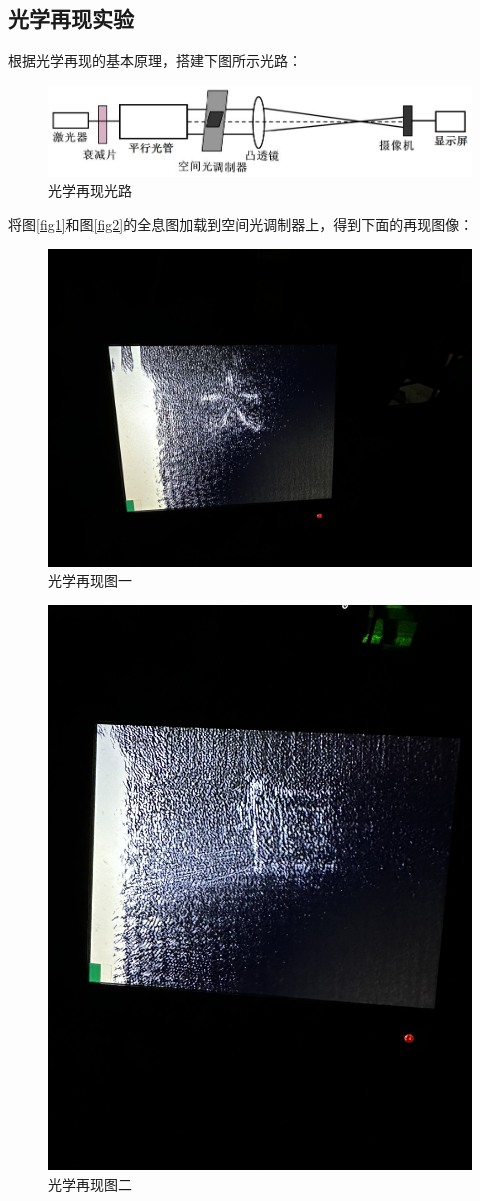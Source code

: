 \documentclass{WHUReport}
\begin{document}
\begin{multicols}{2}
	\section{光学再现实验}
	根据光学再现的基本原理，搭建下图所示光路：
	\begin{figure}[H]
		\centering
		\includegraphics[width=\linewidth]{figs/光学再现.jpg}
		\caption{光学再现光路}
	\end{figure}
	将图\ref{fig1}和图\ref{fig2}的全息图加载到空间光调制器上，得到下面的再现图像：
	\begin{figure}[H]
		\centering
		\includegraphics[width=.8\linewidth]{figs/5.jpg}
		\caption{光学再现图一}
	\end{figure}
	\begin{figure}[H]
		\centering
		\includegraphics[width=.8\linewidth，=,angle=270]{figs/6.jpg}
		\caption{光学再现图二}
	\end{figure}

\end{multicols}
\end{document}
